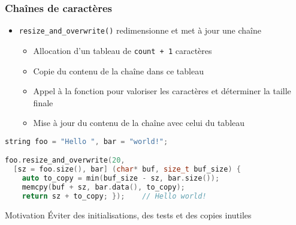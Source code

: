 \documentclass[C++.tex]{subfiles}
\begin{document}
\begin{frame}[fragile]
	\frametitle{Chaînes de caractères}
	\begin{itemize}
		\item \lstinline|resize_and_overwrite()| redimensionne et met à jour une chaîne
		\begin{itemize}
			\item Allocation d'un tableau de \lstinline|count + 1| caractères
			\item Copie du contenu de la chaîne dans ce tableau


			\item Appel à la fonction pour valoriser les caractères et déterminer la taille finale
			\item Mise à jour du contenu de la chaîne avec celui du tableau
		\end{itemize}
	\end{itemize}

	\begin{lstlisting}[language=C++]
string foo = "Hello ", bar = "world!";

foo.resize_and_overwrite(20, 
  [sz = foo.size(), bar] (char* buf, size_t buf_size) {
    auto to_copy = min(buf_size - sz, bar.size());
    memcpy(buf + sz, bar.data(), to_copy);
    return sz + to_copy; });	// Hello world!\end{lstlisting}

	\begin{block}{Motivation}
		Éviter des initialisations, des tests et des copies inutiles
	\end{block}


\end{frame}
\end{document}
